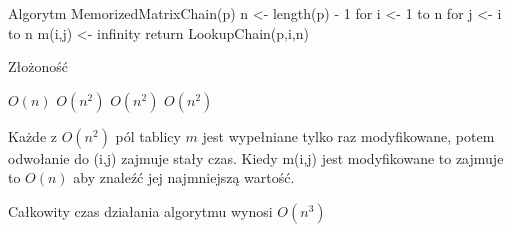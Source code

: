 \begin{enumerate}
Algorytm MemorizedMatrixChain(p)
n <- length(p) - 1
for i <- 1 to n
	for j <- i to n
		m(i,j) <- infinity
return LookupChain(p,i,n)
\end{enumerate}

Złożoność 
\begin{enumerate}
$O(n)$
$O(n^2)$
$O(n^2)$
$O(n^2)$

Każde z $O(n^2)$ pól tablicy $m$ jest wypełniane tylko raz modyfikowane, potem odwołanie do (i,j) zajmuje stały czas.
Kiedy m(i,j) jest modyfikowane to zajmuje to $O(n)$ aby znaleźć jej najmniejszą wartość.
\end{enumerate}
Całkowity czas działania algorytmu wynosi $O(n^3)$

